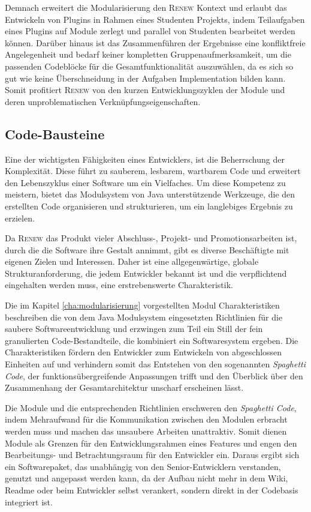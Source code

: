 		Demnach erweitert die Modularisierung den \textsc{Renew} Kontext und erlaubt das Entwickeln von Plugins in Rahmen eines Studenten Projekts, indem Teilaufgaben eines Plugins auf Module zerlegt und parallel von Studenten bearbeitet werden können. Darüber hinaus ist das Zusammenführen der Ergebnisse eine konfliktfreie Angelegenheit und bedarf keiner kompletten Gruppenaufmerksamkeit, um die passenden Codeblöcke für die Gesamtfunktionalität auszuwählen, da es sich so gut wie keine Überschneidung in der Aufgaben Implementation bilden kann. Somit profitiert \textsc{Renew} von den kurzen Entwicklungszyklen der Module und deren unproblematischen Verknüpfungseigenschaften. 

	\subsection{Code-Bausteine}\label{sub:cbs}
		Eine der wichtigsten Fähigkeiten eines Entwicklers, ist die Beherrschung der Komplexität. Diese führt zu sauberem, lesbarem, wartbarem Code und erweitert den Lebenszyklus einer Software um ein Vielfaches. Um diese Kompetenz zu meistern, bietet das Modulsystem von Java unterstützende Werkzeuge, die den erstellten Code organisieren und strukturieren, um ein langlebiges Ergebnis zu erzielen.\bigbreak

		Da \textsc{Renew} das Produkt vieler Abschluss-, Projekt- und Promotionsarbeiten ist, durch die die Software ihre Gestalt annimmt, gibt es diverse Beschäftigte mit eigenen Zielen und Interessen. Daher ist eine allgegenwärtige, globale Strukturanforderung, die jedem Entwickler bekannt ist und die verpflichtend eingehalten werden muss, eine erstrebenswerte Charakteristik.\bigbreak

		Die im Kapitel \ref{cha:modularisierung} vorgestellten Modul Charakteristiken beschreiben die von dem Java Modulsystem eingesetzten Richtlinien für die saubere Softwareentwicklung und erzwingen zum Teil ein Still der fein granulierten Code-Bestandteile, die kombiniert ein Softwaresystem ergeben.\newline
		Die Charakteristiken fördern den Entwickler zum Entwickeln von abgeschlossen Einheiten auf und verhindern somit das Entstehen von den sogenannten \textit{Spaghetti Code}, der funktionsübergreifende Anpassungen trifft und den Überblick über den Zusammenhang der Gesamtarchitektur unscharf erscheinen lässt. \bigbreak

		Die Module und die entsprechenden Richtlinien erschweren den \textit{Spaghetti Code}, indem Mehraufwand für die Kommunikation zwischen den Modulen erbracht werden muss und machen das unsaubere Arbeiten unattraktiv. Somit dienen Module als Grenzen für den Entwicklungsrahmen eines Features und engen den Bearbeitungs- und Betrachtungsraum für den Entwickler ein. Daraus ergibt sich ein Softwarepaket, das unabhängig von den Senior-Entwicklern verstanden, genutzt und angepasst werden kann, da der Aufbau nicht mehr in dem Wiki, Readme oder beim Entwickler selbst verankert, sondern direkt in der Codebasis integriert ist.\bigbreak

